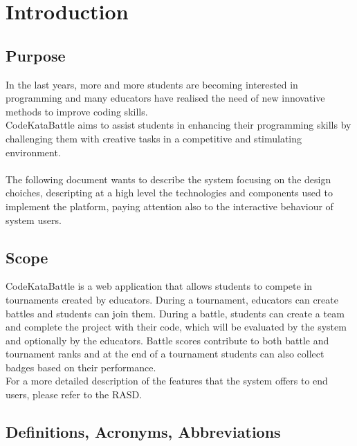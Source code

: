 \chapter{Introduction}

\section{Purpose}
In the last years, more and more students are becoming interested in programming and many educators have realised 
the need of new innovative methods to improve coding skills. \\
CodeKataBattle aims to assist students in enhancing their programming skills by challenging them with creative tasks
 in a competitive and stimulating environment. \\
 \\
 The following document wants to describe the system focusing on the design choiches, descripting at a high level the technologies
  and components used to implement the platform, paying attention also to the interactive behaviour of system users.\\
  
\section{Scope}
CodeKataBattle is a web application that allows students to compete in tournaments created by educators. During a tournament, educators 
can create battles and students can join them. During a battle, students can create a team and complete the project with their code, which 
will be evaluated by the system and optionally by the educators. Battle scores contribute to both battle and tournament ranks and at the end 
of a tournament students can also collect badges based on their performance.\\
For a more detailed description of the features that the system offers to end users, please refer to the RASD.\\

\section{Definitions, Acronyms, Abbreviations}
